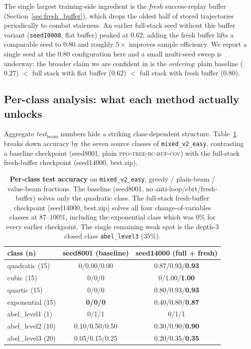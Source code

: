 \documentclass{article}
\theoremstyle{plain}
\theoremstyle{definition}
\theoremstyle{remark}
\begin{document}
The single largest training-side ingredient is the \emph{fresh} success-replay buffer (Section~\ref{sec:fresh_buffer}), which drops the oldest half of stored trajectories periodically to combat staleness. An earlier full-stack seed without this buffer variant (\texttt{seed10000}, flat buffer) peaked at $0.62$; adding the fresh buffer lifts a comparable seed to $0.80$ and roughly $5\times$ improves sample efficiency. We report a single seed at the $0.80$ configuration here and a small multi-seed sweep is underway; the broader claim we are confident in is the \emph{ordering}: plain baseline ($0.27$) $<$ full stack with flat buffer ($0.62$) $<$ full stack with fresh buffer ($0.80$).

\subsection{Per-class analysis: what each method actually unlocks}
\label{sec:per_class}
Aggregate \textit{test}$_{\text{beam}}$ numbers hide a striking class-dependent structure. Table~\ref{tab:per_class} breaks down accuracy by the seven source classes of \texttt{mixed\_v2\_easy}, contrasting a baseline checkpoint (seed8001, plain \textsc{ppo-tree-rc-buf-cov}) with the full-stack fresh-buffer checkpoint (seed14000, best.zip).

\begin{table}[h]
\centering
\small
\begin{tabular}{lcc}
\toprule
class (n)            & seed8001 (baseline) & \textbf{seed14000 (full + fresh)} \\
\midrule
quadratic (15)       & 0/0.00/0.00        & 0.87/0.93/\textbf{0.93} \\
cubic (15)           & 0/0/0              & 0/1.00/\textbf{1.00}    \\
quartic (15)         & 0/0/0              & 0.80/0.93/\textbf{0.93} \\
exponential (15)     & \textbf{0/0/0}     & 0.40/0.80/\textbf{0.87} \\
abel\_level1 (1)     & 0/1/1              & 0/1/1                   \\
abel\_level2 (10)    & 0.10/0.50/0.50     & 0.30/0.90/\textbf{0.90} \\
abel\_level3 (20)    & 0.05/0.15/0.25     & 0.20/0.35/\textbf{0.35} \\
\bottomrule
\end{tabular}
\caption{\textbf{Per-class test accuracy} on \texttt{mixed\_v2\_easy}, greedy / plain-beam / value-beam fractions. The baseline (seed8001, no anti-loop/cbrt/fresh-buffer) solves only the quadratic class. The full-stack fresh-buffer checkpoint (seed14000, best.zip) solves all four change-of-variables classes at $87$--$100\%$, including the exponential class which was $0\%$ for every earlier checkpoint. The single remaining weak spot is the depth-3 closed class \texttt{abel\_level3} ($35\%$).}
\label{tab:per_class}
\end{table}
\end{document}
